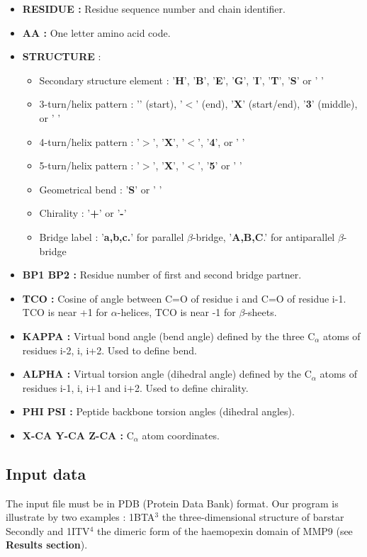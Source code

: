 \documentclass[12pt]{article}
\begin{document}
\begin{itemize}
	\item\textbf{RESIDUE :} Residue sequence number and chain identifier.
	\item\textbf{AA :} One letter amino acid code.
	\item\textbf{STRUCTURE} :
	\begin{itemize}
		\item Secondary structure element : '\textbf{H}', '\textbf{B}', '\textbf{E}', '\textbf{G}', '\textbf{I}', '\textbf{T}', '\textbf{S}' or ' '
		\item 3-turn/helix pattern : '\boldmath{$>$}' (start), '\textbf{$<$}' (end),  '\textbf{X}' (start/end), '\textbf{3}' (middle), or ' '
		\item 4-turn/helix pattern : '\textbf{$>$}', '\textbf{X}', '\textbf{$<$}', '\textbf{4}', or ' '
		\item 5-turn/helix pattern : '\textbf{$>$}', '\textbf{X}', '\textbf{$<$}', '\textbf{5}' or ' '
		\item Geometrical bend : '\textbf{S}' or ' '
		\item Chirality : '\textbf{+}' or '\textbf{-}'
		\item Bridge label : '\textbf{a,b,c.}' for parallel $\beta$-bridge, '\textbf{A,B,C}.' for antiparallel $\beta$-bridge
	\end{itemize}
	\item\textbf{BP1 BP2 :} Residue number of first and second bridge partner.
	\item\textbf{TCO :} Cosine of angle between C=O of residue i and C=O of residue i-1. TCO is near +1 for $\alpha$-helices, TCO is near -1 for $\beta$-sheets.
	\item\textbf{KAPPA :} Virtual bond angle (bend angle) defined by the three C$_\alpha$ atoms of residues i-2, i, i+2. Used to define bend.
	\item\textbf{ALPHA :} Virtual torsion angle (dihedral angle) defined by the C$_\alpha$ atoms of residues i-1, i, i+1 and i+2. Used to define chirality.
	\item\textbf{PHI PSI :} Peptide backbone torsion angles (dihedral angles).
	\item\textbf{X-CA Y-CA Z-CA :} C$_\alpha$ atom coordinates.
\end{itemize}


\subsection{Input data}
The input file must be in PDB (Protein Data Bank) format. Our program is illustrate by two examples : 1BTA$^3$ the three-dimensional structure of barstar Secondly and 1ITV$^4$ the dimeric form of the haemopexin domain of MMP9 (see \textbf{Results section}).
\end{document}
